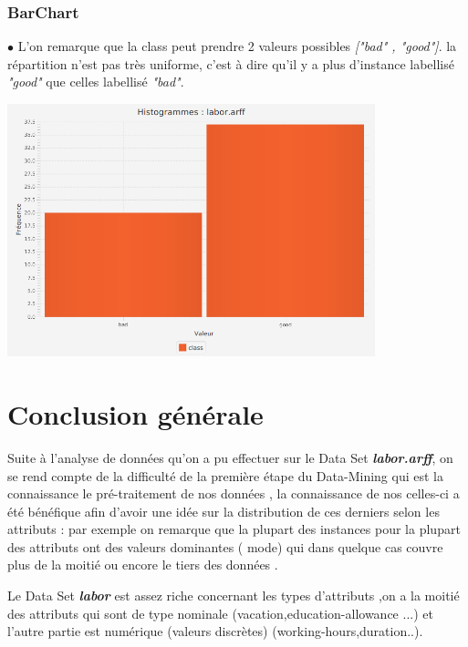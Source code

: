 \documentclass[12pt,a4paper,oneside]{book}
\begin{document}
\subsubsection{BarChart}
$\bullet $ L'on remarque que la class peut prendre 2 valeurs possibles \textit{["bad" , "good"]}.  la répartition n'est pas très uniforme, c'est à dire qu'il y a plus d'instance labellisé \textit{"good"} que celles labellisé \textit{"bad"}.\\

\begin{center}
	\includegraphics[width=0.8\textwidth]{screens/barchart/class-barchart.png}%
	\label{labelname}%
\end{center}


\newpage

\section{Conclusion générale}

Suite à l'analyse de données qu'on a pu effectuer sur le Data Set \textbf{\textit{labor.arff}}, on se rend compte de la difficulté de la première étape du Data-Mining qui est la connaissance  le pré-traitement de nos données , la connaissance de nos celles-ci a été bénéfique afin d'avoir une idée sur la distribution de ces derniers selon les attributs : par exemple on remarque que la plupart des instances pour la plupart des attributs ont des valeurs dominantes ( mode) qui dans quelque cas couvre plus de la moitié ou encore le tiers des données .

Le Data Set \textbf{\textit{labor}} est assez riche concernant les types d'attributs ,on a la moitié des attributs qui sont de type nominale (vacation,education-allowance ...) et
l'autre partie est numérique (valeurs discrètes) (working-hours,duration..).
\end{document}
